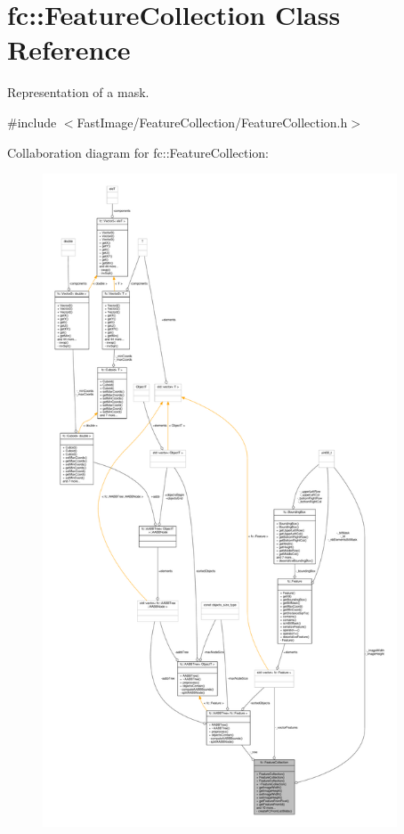 \hypertarget{classfc_1_1FeatureCollection}{}\section{fc\+:\+:Feature\+Collection Class Reference}
\label{classfc_1_1FeatureCollection}


Representation of a mask.  




{\ttfamily \#include $<$Fast\+Image/\+Feature\+Collection/\+Feature\+Collection.\+h$>$}



Collaboration diagram for fc\+:\+:Feature\+Collection\+:
\nopagebreak
\begin{figure}[H]
\begin{center}
\leavevmode
\includegraphics[height=550pt]{de/d11/classfc_1_1FeatureCollection__coll__graph}
\end{center}
\end{figure}
